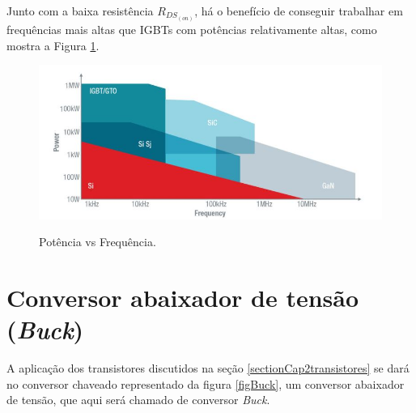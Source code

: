 \noindent Junto com a baixa resistência $R_{DS_(on)}$, há o benefício de conseguir trabalhar em frequências mais altas que IGBTs com potências relativamente altas, como mostra a Figura \ref{FigComparison}. 
\begin{figure}[H]
\caption{Potência vs Frequência. \cite{Sameer}}
 \centering %
\includegraphics[width=14cm]{figuras/6.JPG} 
\label{FigComparison}
\end{figure}

\section{Conversor abaixador de tensão (\textit{Buck})}
\label{sectionCap2Buck}
A aplicação dos transistores discutidos na seção \ref{sectionCap2transistores} se dará no conversor chaveado representado da figura \ref{figBuck}, um conversor abaixador de tensão, que aqui será chamado de conversor \textit{Buck}. 

